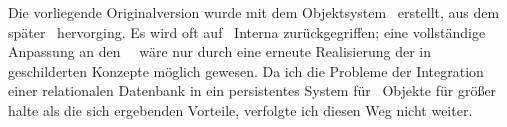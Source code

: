 Die vorliegende Originalversion wurde mit dem Objektsystem
\pcl\ erstellt, aus dem sp\"{a}\-ter \clos\ hervorging.
Es wird oft auf \pcl\ Interna zur\"{u}ckgegriffen; eine
vollst\"{a}ndige Anpassung an den \clos\ \std\ w\"{a}re nur durch eine
erneute Realisierung der in \cite{bib:ro87} geschilderten Konzepte
m\"{o}glich gewesen. Da ich die Probleme der Integration einer
relationalen Datenbank in ein persistentes System f\"{u}r \cl\ Objekte
f\"{u}r gr\"{o}\ss{}er halte als die sich ergebenden Vorteile, verfolgte ich
diesen Weg nicht weiter.


